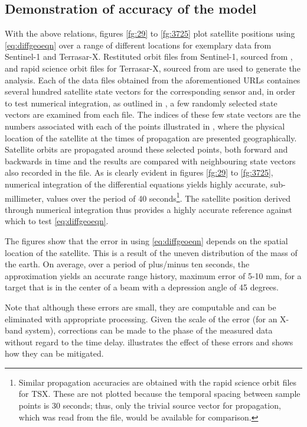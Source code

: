 \subsection{Demonstration of accuracy of the model}
With the above relations, figures \ref{fg:29} to \ref{fg:3725} plot satellite positions using \eqref{eq:diffgeoeqn} over a range of different locations for exemplary data from Sentinel-1 and Terrasar-X. Restituted orbit files from Sentinel-1, sourced from \cite{SentinelPOD}, and rapid science orbit files for Terrasar-X, sourced from \cite{GFZ} are used to generate the analysis. Each of the data files obtained from the aforementioned URLs containes several hundred satellite state vectors for the corresponding sensor and, in order to test numerical integration, as outlined in , a few randomly selected state vectors are examined from each file. The indices of these few state vectors are the numbers associated with each of the points illustrated in , where the physical location of the satellite at the times of propagation are presented geographically. Satellite orbits are propagated around these selected points, both forward and backwards in time and the results are compared with neighbouring state vectors also recorded in the file. As is clearly evident in figures \ref{fg:29} to \ref{fg:3725}, numerical integration of the differential equations yields highly accurate, sub-millimeter, values over the period of 40 seconds\footnote{Similar propagation accuracies are obtained with the rapid science orbit files for TSX. These are not plotted because the temporal spacing between sample points is 30 seconds; thus, only the trivial source vector for propagation, which was read from the file, would be available for comparison.}. The satellite position derived through numerical integration thus provides a highly accurate reference against which to test \eqref{eq:diffgeoeqn}. 
\par
The figures show that the error in using \eqref{eq:diffgeoeqn} depends on the spatial location of the satellite. This is a result of the uneven distribution of the mass of the earth. On average, over a period of plus/minus ten seconds, the approximation yields an accurate range history, maximum error of 5-10 mm, for a target that is in the center of a beam with a depression angle of 45 degrees. 
\par
Note that although these errors are small, they are computable and can be eliminated with appropriate processing. Given the scale of the error (for an X-band system), corrections can be made to the phase of the measured data without regard to the time delay.   illustrates the effect of these errors and shows how they can be mitigated.  

